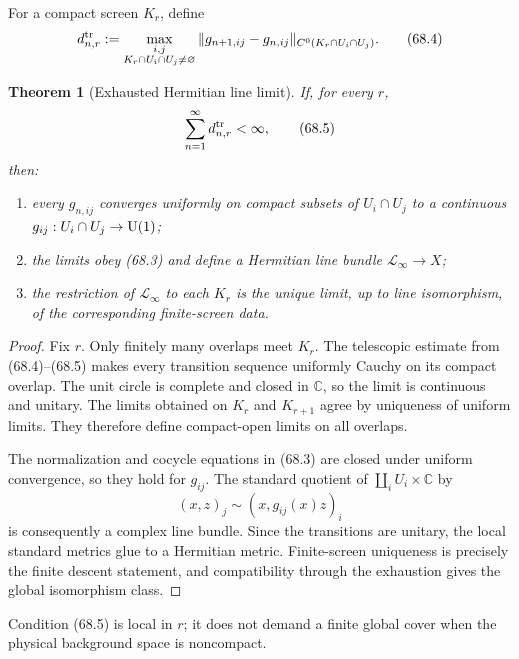 \documentclass[11pt]{article}
\newtheorem{theorem}{Theorem}[section]
\theoremstyle{remark}
\begin{document}
For a compact screen \(K_r\), define
\begin{equation}
 d_{n,r}^{\rm tr}
 :=
 \max_{\substack{i,j\\K_r\cap U_i\cap U_j\ne\varnothing}}
 \|g_{n+1,ij}-g_{n,ij}\|_
 {C^0(K_r\cap U_i\cap U_j)}.                      \tag{68.4}
\end{equation}

\begin{theorem}[Exhausted Hermitian line limit]
\label{thm:v12v68-line-limit}
If, for every \(r\),
\begin{equation}
                         \sum_{n=1}^\infty
 d_{n,r}^{\rm tr}<\infty,                         \tag{68.5}
\end{equation}
then:
\begin{enumerate}
\item every \(g_{n,ij}\) converges uniformly on compact subsets of
\(U_i\cap U_j\) to a continuous \(g_{ij}:U_i\cap U_j\to{\rm U}(1)\);
\item the limits obey (68.3) and define a Hermitian line bundle
\(\mathscr L_\infty\to X\);
\item the restriction of \(\mathscr L_\infty\) to each \(K_r\) is
the unique limit, up to line isomorphism, of the corresponding
finite-screen data.
\end{enumerate}
\end{theorem}

\begin{proof}
Fix \(r\).  Only finitely many overlaps meet \(K_r\).  The telescopic
estimate from (68.4)--(68.5) makes every transition sequence
uniformly Cauchy on its compact overlap.  The unit circle is complete
and closed in \(\mathbb C\), so the limit is continuous and
unitary.  The limits obtained on \(K_r\) and \(K_{r+1}\) agree by
uniqueness of uniform limits.  They therefore define compact-open
limits on all overlaps.

The normalization and cocycle equations in (68.3) are closed under
uniform convergence, so they hold for \(g_{ij}\).  The standard
quotient of
\(\coprod_i U_i\times\mathbb C\) by
\[
 (x,z)_j\sim(x,g_{ij}(x)z)_i
\]
is consequently a complex line bundle.  Since the transitions are
unitary, the local standard metrics glue to a Hermitian metric.
Finite-screen uniqueness is precisely the finite descent statement,
and compatibility through the exhaustion gives the global
isomorphism class.
\end{proof}

Condition (68.5) is local in \(r\); it does not demand a finite
global cover when the physical background space is noncompact.
\end{document}
